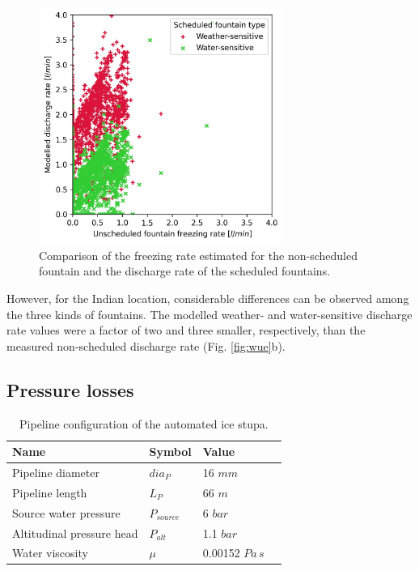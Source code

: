 \documentclass[tc, manuscript]{copernicus}
\begin{document}
\begin{figure}[htb]
\includegraphics[width=8cm]{Figures/simvsreal.jpg}

\caption{ Comparison of the freezing rate estimated for the non-scheduled fountain and the discharge rate of the
scheduled fountains. }

\label{fig:simvsreal}
\end{figure}

However, for the Indian location, considerable differences can be observed among the three kinds of fountains.
The modelled weather- and water-sensitive discharge rate values were a factor of two and three smaller,
respectively, than the measured non-scheduled discharge rate (Fig. \ref{fig:wue}b).

\subsection{Pressure losses}

\begin{table}[htb]
\centering
\caption{Pipeline configuration of the automated ice stupa.}
\label{tab:pipe}
\begin{tabular}{@{}llll@{}}
\toprule
\textbf{Name} & \textbf{Symbol} & \textbf{Value} & \\ \midrule
\multicolumn{1}{|l}{Pipeline diameter}      & $dia_P$ & 16 $mm$ & \multicolumn{1}{l|}{} \\ \midrule
\multicolumn{1}{|l}{Pipeline length}        & $L_P$ & 66 $m$ & \multicolumn{1}{l|}{} \\ \midrule
\multicolumn{1}{|l}{Source water pressure} & $P_{source}$ & 6 $bar$  & \multicolumn{1}{l|}{} \\\midrule 
\multicolumn{1}{|l}{Altitudinal pressure head}  & $P_{alt}$ & 1.1 $bar$ & \multicolumn{1}{l|}{} \\ \midrule
\multicolumn{1}{|l}{Water viscosity}  & $\mu$ & 0.00152 $Pa\,s$ & \multicolumn{1}{l|}{} \\ \bottomrule
\end{tabular}
\end{table}
\end{document}
